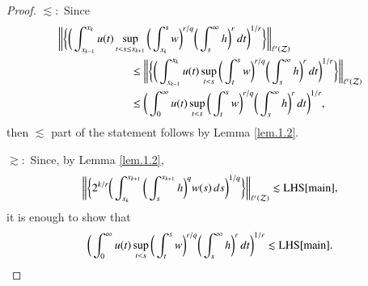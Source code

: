 \documentclass[12pt]{amsart}
\theoremstyle{plain}
\theoremstyle{definition}
\numberwithin{thm}{section}
\numberwithin{equation}{section}
\begin{document}
\begin{proof}
	{\bf $\lesssim:$} Since 
	\begin{align*}
	\bigg\| \bigg\{ \bigg( \int_{x_{k-1}}^{x_k} u(t) \sup_{t < s \le x_{k+1}} \bigg(
	\int_{x_k}^s w \bigg)^{r / q} \bigg( \int_s^{\infty} h
	\bigg)^r \,dt\bigg)^{1/r} \bigg\} \bigg\|_{\ell^r({\mathcal Z})} & \\
	& \hspace{-5cm} \le \bigg\| \bigg\{ \bigg( \int_{x_{k-1}}^{x_k} u(t) \sup_{t < s} \bigg(
	\int_t^s w \bigg)^{r / q} \bigg( \int_s^{\infty} h\bigg)^r \,dt\bigg)^{1/r} \bigg\} \bigg\|_{\ell^r({\mathcal Z})} \\
	& \hspace{-5cm} \le \bigg( \int_0^{\infty}  u(t) \sup_{t < s} \bigg(
	\int_t^s w \bigg)^{r / q} \bigg( \int_s^{\infty} h\bigg)^r \,dt\bigg)^{1/r},
	\end{align*}
	then $\lesssim$ part of the statement follows by Lemma \ref{lem.1.2}.
	
	{\bf $\gtrsim:$} Since, by Lemma \ref{lem.1.2},
	$$
	\bigg\| \bigg\{ 2^{k / r} \bigg(
	\int_{x_k}^{x_{k+1}} \bigg( \int_s^{x_{k+1}} h \bigg)^q
	w(s)\,ds\bigg)^{ 1 / q} \bigg\} \bigg\|_{\ell^r({\mathcal Z})} \lesssim {\operatorname{LHS}}{\eqref{main}},
	$$
	it is enough to show that 
	$$
	\bigg( \int_0^{\infty}  u(t) \sup_{t < s} \bigg(
	\int_t^s w \bigg)^{r / q} \bigg( \int_s^{\infty} h\bigg)^r \,dt\bigg)^{1/r} \lesssim {\operatorname{LHS}}{\eqref{main}}.
	$$


\end{proof}
\end{document}
